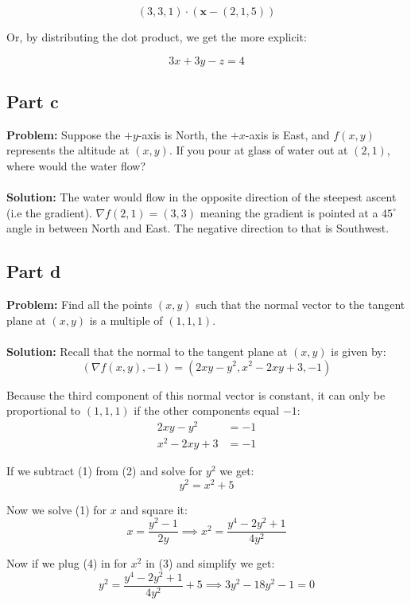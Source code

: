 \documentclass{article}
\begin{document}
$$(3,3,1)\cdot(\mathbf x-(2,1,5))$$

Or, by distributing the dot product, we get the more explicit:

$$3x+3y-z=4$$

\subsection*{Part c}
\textbf{Problem:} Suppose the $+y$-axis is North, the $+x$-axis is East, and $f(x,y)$ represents the altitude at $(x,y)$. If you pour at glass of water out at $(2,1)$, where would the water flow?
\\\\
\textbf{Solution:} The water would flow in the opposite direction of the steepest ascent (i.e the gradient). $\nabla f(2,1)=(3,3)$ meaning the gradient is pointed at a $45^\circ$ angle in between North and East. The negative direction to that is Southwest.

\subsection*{Part d}
\setcounter{equation}{0}
\textbf{Problem:} Find all the points $(x,y)$ such that the normal vector to the tangent plane at $(x,y)$ is a multiple of $(1,1,1)$.
\\\\
\textbf{Solution:} Recall that the normal to the tangent plane at $(x,y)$ is given by:
$$(\nabla f(x,y),-1)=(2xy-y^2,x^2-2xy+3,-1)$$

Because the third component of this normal vector is constant, it can only be proportional to $(1,1,1)$ if the other components equal $-1$:
\begin{align}
  2xy-y^2&=-1\\
  x^2-2xy+3&=-1
\end{align}

If we subtract (1) from (2) and solve for $y^2$ we get:
\begin{equation}
  y^2=x^2+5
\end{equation}

Now we solve (1) for $x$ and square it:
\begin{equation}
  x=\frac{y^2-1}{2y}\implies x^2=\frac{y^4-2y^2+1}{4y^2}
\end{equation}

Now if we plug (4) in for $x^2$ in (3) and simplify we get:
\begin{equation}
  y^2=\frac{y^4-2y^2+1}{4y^2}+5\implies 3y^2-18y^2-1=0
\end{equation}
\end{document}

